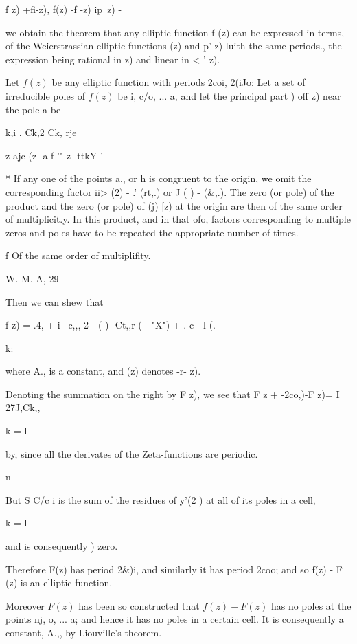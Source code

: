 {f z) +fi-z), f(z) -f -z) ip\ z) -\

we obtain the theorem that any elliptic function f (z) can be
expressed in terms, of the Weierstrassian elliptic functions (z) and
p' z) luith the same periods., the expression being rational in z) and
linear in < ' z).


Let $f(z)$ be any elliptic function with periods 2coi, 2(iJo: Let a set
of irreducible poles of $f(z)$ be i, c/o, ... a, and let the principal
part ) off z) near the pole a be

 k,i . Ck,2 Ck, rje

z-ajc (z- a f '" z- ttkY '

* If any one of the points a,, or h is congruent to the origin, we
omit the corresponding factor ii> (2) - .' (rt,.) or J ( ) - (\&,.).
The zero (or pole) of the product and the zero (or pole) of (j) [z) at
the origin are then of the same order of multiplicit.y. In this
product, and in that ofo, factors corresponding to multiple
zeros and poles have to be repeated the appropriate number of times.

f Of the same order of multiplifity.

W. M. A, 29

%
%

Then we can shew that

f z) = .4, + i \ c,,, 2 - ( ) -Ct,,r ( - "X") + . c - l (.

k:

where A., is a constant, and (z) denotes -r- z).

Denoting the summation on the right by F z), we see that F z +
-2co,)-F z)= I 27J,Ck,,

k = l

by, since all the derivates of the Zeta-functions are
periodic.

n

But S C/c i is the sum of the residues of y'(2 ) at all of its poles
in a cell,

k = l

and is consequently ) zero.

Therefore F(z) has period 2\&)i, and similarly it has period 2coo; and
so f(z) - F (z) is an elliptic function.

Moreover $F(z)$ has been so constructed that $f(z) - F(z)$ has no poles at
the points nj, o, ... a; and hence it has no poles in a certain cell.
It is consequently a constant, A.,, by Liouville's theorem.

}
